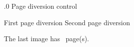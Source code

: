 .0 {Page diversion control}

First page diversion %
\newpage
Second page diversion %
\newpage
{} %

\endfeature

%
%




\hbox{\pdfrefximage \pdflastximage}


The last image has \the\pdflastximagepages\ page(s).

